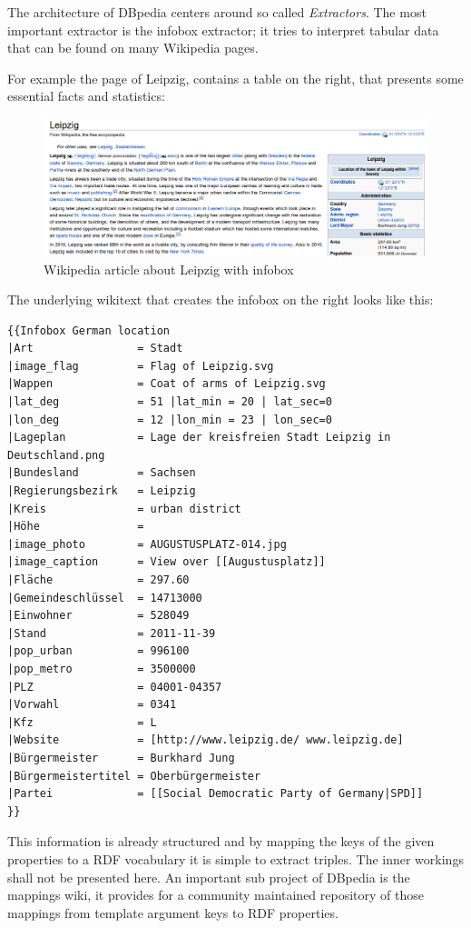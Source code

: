 The architecture of DBpedia centers around so called \textit{Extractors}. The most important extractor is the infobox extractor; it tries to interpret tabular data that can be found on many Wikipedia pages.

For example the page of Leipzig, contains a table on the right, that presents some essential facts and statistics:

\begin{figure}[htbp]
\centering
\includegraphics[width=\textwidth]{./images/leipzig-full}
\caption{Wikipedia article about Leipzig with infobox}
\label{fig:leipzig-full}
\end{figure}

The underlying wikitext that creates the infobox on the right looks like this:

\begin{lstlisting}[style=wikitext]
{{Infobox German location
|Art                = Stadt
|image_flag         = Flag of Leipzig.svg
|Wappen             = Coat of arms of Leipzig.svg
|lat_deg            = 51 |lat_min = 20 | lat_sec=0
|lon_deg            = 12 |lon_min = 23 | lon_sec=0
|Lageplan           = Lage der kreisfreien Stadt Leipzig in Deutschland.png
|Bundesland         = Sachsen
|Regierungsbezirk   = Leipzig
|Kreis              = urban district
|Höhe               =
|image_photo        = AUGUSTUSPLATZ-014.jpg
|image_caption      = View over [[Augustusplatz]]
|Fläche             = 297.60
|Gemeindeschlüssel  = 14713000
|Einwohner          = 528049
|Stand              = 2011-11-39
|pop_urban          = 996100
|pop_metro          = 3500000
|PLZ                = 04001-04357
|Vorwahl            = 0341
|Kfz                = L
|Website            = [http://www.leipzig.de/ www.leipzig.de]
|Bürgermeister      = Burkhard Jung
|Bürgermeistertitel = Oberbürgermeister
|Partei             = [[Social Democratic Party of Germany|SPD]]
}}
\end{lstlisting}

This information is already structured and by mapping the keys of the given properties to a RDF vocabulary it is simple to extract triples. The inner workings shall not be presented here. An important sub project of DBpedia is the mappings wiki, it provides for a community maintained repository of those mappings from template argument keys to RDF properties.

